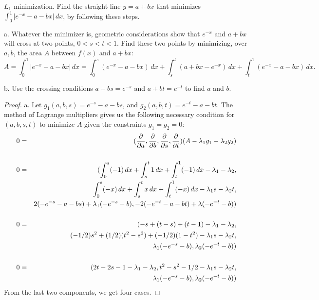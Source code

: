 \documentclass{article}
\begin{document}
 $L_1$ minimization. Find the straight line $y = a + bx$ that minimizes  $\int_0^1|e^{-x} - a - bx| \, dx$, by following these steps.

a. Whatever the minimizer is, geometric considerations show that $e^{-x}$ and $a+bx$ will cross at two points, $0 < s < t < 1$. Find these two points by minimizing, over $a,b$, the area $A$ between $f(x)$ and $a+bx$:
$$A=\int_0^1 |e^{-x} - a -bx| \, dx = \int_0^s (e^{-x} - a -bx)\,dx + \int_s^t (a+bx-e^{-x}) \,dx +  \int_t^1(e^{-x} - a - bx) \,dx.$$

b. Use the crossing conditions $a + bs = e^{-s}$ and $a + bt = e^{-t}$ to find $a$ and $b$.

\begin{proof}

a. Let $g_1(a,b,s) = e^{-s} - a - bs$, and $g_2(a,b,t) = e^{-t} - a - bt$.
The method of Lagrange multipliers gives us the following necessary condition for $(a,b,s,t)$ to minimize $A$ given the constraints $g_1 = g_2 = 0$:
\begin{align}
 0      & = &  (\frac{\partial}{\partial a}, \frac{\partial}{\partial b}, \frac{\partial}{\partial s}, \frac{\partial}{\partial t}) (A - \lambda_1 g_1 - \lambda_2 g_2) \nonumber
\\ \nonumber
\\ 0     & = & ( \int_0^s  (-1) \,dx + \int_s^t 1 \,dx + \int_t^1 (-1) \, dx  - \lambda_1 - \lambda_2 , \nonumber
\\ & &                \int_0^s  (-x) \,dx + \int_s^t x \,dx + \int_t^1 (-x) \, dx  - \lambda_1 s - \lambda_2 t, \nonumber
\\ & &           2(-e^{-s} - a -bs)  + \lambda_1(-e^{-s} - b),
                - 2(-e^{-t} - a - bt) + \lambda(-e^{-t} - b)) \nonumber
\\ \nonumber
\\  0    & = & ( -s + (t - s) + (t - 1) - \lambda_1 - \lambda_2, \nonumber
\\ & &            (-1/2)s^2  + (1/2)(t^2 - s^2)  + (-1/2) (1 - t^2) - \lambda_1 s - \lambda_2 t, \nonumber
\\ & &          \lambda_1(-e^{-s} - b),
                \lambda_2(-e^{-t} - b)) \nonumber
\\ \nonumber
\\ 0    & = & ( 2t - 2s - 1 - \lambda_1 - \lambda_2, t^2 - s^2 - 1/2  - \lambda_1 s - \lambda_2 t, \nonumber
\\ & &  \lambda_1(-e^{-s} - b), \lambda_2(-e^{-t} - b) ) \label{eq1}
\end{align}
From the last two components, we get four cases.


\end{proof}
\end{document}
